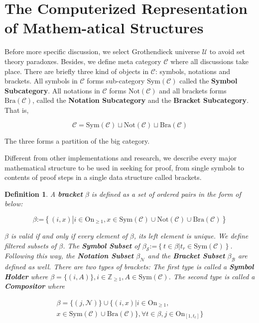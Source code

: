 \documentclass{aims}
\numberwithin{equation}{section}
\newtheorem{definition}{Definition}	%
\numberwithin{theorem}{section}	%
\numberwithin{axiom}{section}	%
\numberwithin{definition}{section}	%
\begin{document}
	\section{The Computerized Representation of Mathem-atical Structures}
	
	Before more specific discussion, we select Grothendieck universe \(\mathcal{U}\) \cite{Li2019} to avoid set theory paradoxes. Besides, we define meta category \(\mathcal{C}\) where all discussions take place. There are briefly three kind of objects in \(\mathcal{C}\): symbols, notations and brackets. All symbols in \(\mathcal{C}\) forms sub-category \(\text{Sym}(\mathcal{C})\) called the \textbf{ Symbol Subcategory}. All notations in \(\mathcal{C}\) forms \(\text{Not}(\mathcal{C})\) and all brackets forms \(\text{Bra}(\mathcal{C})\), called the \textbf{ Notation Subcategory} and the \textbf{ Bracket Subcategory}. That is,
	
	\begin{equation}
		\mathcal{C}=\text{Sym}(\mathcal{C})\sqcup \text{Not}(\mathcal{C})\sqcup \text{Bra}(\mathcal{C})
	\end{equation}
	
	The three forms a partition of the big category.
	
	Different from other implementations and research, we describe every major mathematical structure to be used in seeking for proof, from single symbols to contents of proof steps in a single data structure called brackets.
	
	\begin{definition}
		A \textbf{ bracket} \(\beta\) is defined as a set of ordered pairs in the form of below:
		
		\begin{equation}
			\beta \text{:=}\left\{(i,x)\left|i\in \text{On}_{\geq 1}\right.,x\in \text{Sym}(\mathcal{C})\cup \text{Not}(\mathcal{C})\cup \text{Bra}(\mathcal{C})\right\}
		\end{equation}
		
		\(\beta\) is valid if and only if every element of \(\beta\), its left element is unique. We define filtered subsets of \(\beta\). The \textbf{ Symbol Subset} of \(\beta _{\mathcal{S}}\text{:=}\left\{t\in \beta \left|t_{\mathit{r}}\in \text{Sym}(\mathcal{C})\right.\right\}\). Following this way, the \textbf{ Notation Subset} \(\beta _{\mathcal{N}}\) and the \textbf{ Bracket Subset} \(\beta _{\mathcal{B}}\) are defined as well. There are two types of brackets: The first type is called a \textbf{ Symbol Holder} where \(\beta =\{(i,A)\},i\in \mathbb{Z}_{\geq 1},A\in \text{Sym}(\mathcal{C})\). The second type is called a \textbf{ Compositor} where
		
		\begin{equation}
			\begin{split}
				\beta =\{(j,\mathcal{N})\}\cup \{(i,x)|i\in \text{On}_{\geq 1},\\ x\in \text{Sym}(\mathcal{C})\cup \text{Bra}(\mathcal{C})\},\forall
				t\in \beta ,j\in \text{On}_{[1,t_{\ell }]}\}
			\end{split}
		\end{equation}
	\end{definition}
	
\end{document}
